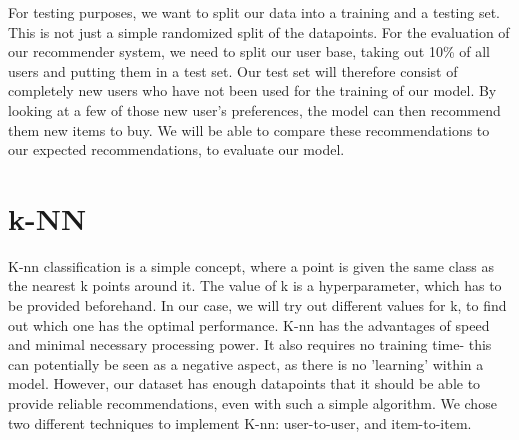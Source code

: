 \documentclass[11pt]{article}
\begin{document}
	For testing purposes, we want to split our data into a training and a testing set. This is not just a simple randomized split of the datapoints. For the evaluation of our recommender system, we need to split our user base, taking out 10\% of all users and putting them in a test set. Our test set will therefore consist of completely new users who have not been used for the training of our model. By looking at a few of those new user's preferences, the model can then recommend them new items to buy. We will be able to compare these recommendations to our expected recommendations, to evaluate our model.
	
	\section{k-NN}
	K-nn classification is a simple concept, where a point is given the same class as the nearest k points around it. The value of k is a hyperparameter, which has to be provided beforehand. In our case, we will try out different values for k, to find out which one has the optimal performance. K-nn has the advantages of speed and minimal necessary processing power. It also requires no training time- this can potentially be seen as a negative aspect, as there is no 'learning' within a model. However, our dataset has enough datapoints that it should be able to provide reliable recommendations, even with such a simple algorithm. We chose two different techniques to implement K-nn: user-to-user, and item-to-item.
\end{document}
